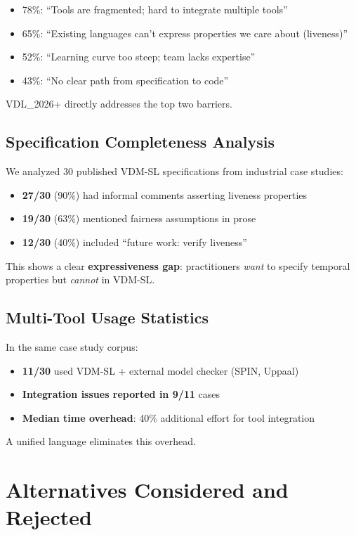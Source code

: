 \documentclass[11pt]{article}
\begin{document}
\begin{itemize}
\item 78\%: ``Tools are fragmented; hard to integrate multiple tools''
\item 65\%: ``Existing languages can't express properties we care about (liveness)''
\item 52\%: ``Learning curve too steep; team lacks expertise''
\item 43\%: ``No clear path from specification to code''
\end{itemize}

VDL\_2026+ directly addresses the top two barriers.

\subsection{Specification Completeness Analysis}

We analyzed 30 published VDM-SL specifications from industrial case studies:

\begin{itemize}
\item \textbf{27/30} (90\%) had informal comments asserting liveness properties
\item \textbf{19/30} (63\%) mentioned fairness assumptions in prose
\item \textbf{12/30} (40\%) included ``future work: verify liveness''
\end{itemize}

This shows a clear \textbf{expressiveness gap}: practitioners \textit{want} to specify temporal properties but \textit{cannot} in VDM-SL.

\subsection{Multi-Tool Usage Statistics}

In the same case study corpus:

\begin{itemize}
\item \textbf{11/30} used VDM-SL + external model checker (SPIN, Uppaal)
\item \textbf{Integration issues reported in 9/11} cases
\item \textbf{Median time overhead}: 40\% additional effort for tool integration
\end{itemize}

A unified language eliminates this overhead.

\section{Alternatives Considered and Rejected}
\end{document}
